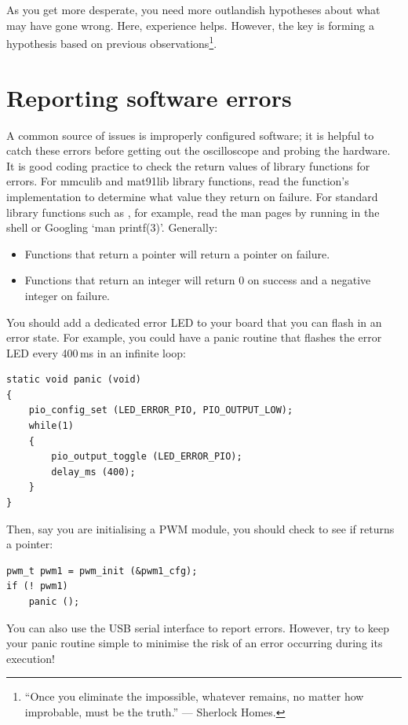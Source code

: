 As you get more desperate, you need more outlandish hypotheses about
what may have gone wrong.  Here, experience helps.  However, the key
is forming a hypothesis based on previous observations\footnote{``Once
  you eliminate the impossible, whatever remains, no matter how
  improbable, must be the truth.'' --- Sherlock Homes.}.


\section{Reporting software errors}
\label{reporting-software-errors}

A common source of issues is improperly configured software; it is
helpful to catch these errors before getting out the oscilloscope and
probing the hardware. It is good coding practice to check the return
values of library functions for errors. For mmculib and mat91lib
library functions, read the function's implementation to determine
what value they return on failure. For standard library functions such
as , for example, read the man pages by running  in the shell or Googling `man printf(3)'. Generally:
%
\begin{itemize}
\item Functions that return a pointer will return a 
  pointer on failure.

\item Functions that return an integer will return 0 on success and a
negative integer on failure.
\end{itemize}

You should add a dedicated error LED to your board that you can flash
in an error state. For example, you could have a panic routine that
flashes the error LED every 400\,ms in an infinite loop:
%
\begin{verbatim}
static void panic (void)
{
    pio_config_set (LED_ERROR_PIO, PIO_OUTPUT_LOW);
    while(1)
    {
        pio_output_toggle (LED_ERROR_PIO);
        delay_ms (400);
    }
}
\end{verbatim}
%
Then, say you are initialising a PWM module, you should check to see
if  returns a  pointer:
%
\begin{verbatim}
pwm_t pwm1 = pwm_init (&pwm1_cfg);
if (! pwm1)
    panic ();
\end{verbatim}
%
You can also use the USB serial interface to report errors. However,
try to keep your panic routine simple to minimise the risk of an error
occurring during its execution!

